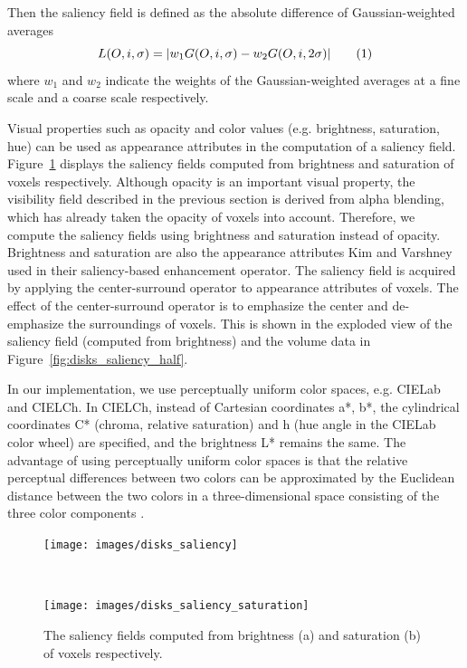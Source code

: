 Then the saliency field is defined as the absolute difference of Gaussian-weighted averages
\[ L(O,i,\sigma)=|w_{1}G(O,i,\sigma)-w_{2}G(O,i,2\sigma)|
\addtag \]
where $ w_{1} $ and $ w_{2} $ indicate the weights of the Gaussian-weighted averages at a fine scale and a coarse scale respectively.

Visual properties such as opacity and color values (e.g. brightness, saturation, hue) can be used as appearance attributes in the computation of a saliency field.
Figure~\ref{fig:disks_saliency} displays the saliency fields computed from brightness and saturation of voxels respectively.
Although opacity is an important visual property, the visibility field described in the previous section is derived from alpha blending, which has already taken the opacity of voxels into account. Therefore, we compute the saliency fields using brightness and saturation instead of opacity. Brightness and saturation are also the appearance attributes Kim and Varshney \cite{kim_saliency-guided_2006} used in their saliency-based enhancement operator.
The saliency field is acquired by applying the center-surround operator to appearance attributes of voxels.
The effect of the center-surround operator is to emphasize the center and de-emphasize the surroundings of voxels. This is shown in the exploded view of the saliency field (computed from brightness) and the volume data in Figure~\ref{fig:disks_saliency_half}.

In our implementation, we use perceptually uniform color spaces, e.g. CIELab and CIELCh.
In CIELCh, instead of Cartesian coordinates a*, b*, the cylindrical coordinates C* (chroma, relative saturation) and h (hue angle in the CIELab color wheel) are specified, and the brightness L* remains the same.
The advantage of using perceptually uniform color spaces is that the relative perceptual differences between two colors can be approximated by the Euclidean distance between the two colors in a three-dimensional space consisting of the three color components \cite{fairchild_color_2013}.

\begin{figure}
	\centering
	\begin{minipage}{.4\textwidth}
		\texttt{[image: images/disks\_saliency]}
		\subcaption{}
	\end{minipage}~
	\begin{minipage}{.4\textwidth}
		\texttt{[image: images/disks\_saliency\_saturation]}
		\subcaption{}
	\end{minipage}
	\caption[The saliency fields computed from brightness and saturation respectively]{The saliency fields computed from brightness (a) and saturation (b) of voxels respectively.}
	\label{fig:disks_saliency}
\end{figure}

